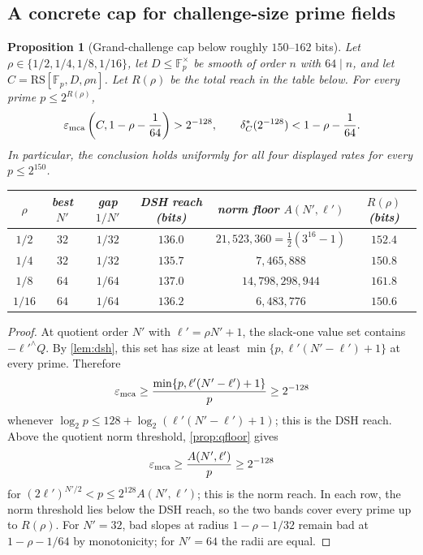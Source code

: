 \documentclass[11pt]{article}
\newtheorem{proposition}[proposition]{Proposition}
\theoremstyle{definition}
\newcommand{\F}{\mathbb F}
\newcommand{\eps}{\varepsilon}
\newcommand{\RS}{\mathrm{RS}}
\newcommand{\emca}{\eps_{\rm mca}}
\newcommand{\Acl}{A}
\begin{document}
\subsection{A concrete cap for challenge-size prime fields}

\begin{proposition}[Grand-challenge cap below roughly $150$--$162$ bits]\label{prop:prize}
Let $\rho\in\{1/2,1/4,1/8,1/16\}$, let $D\le\F_p^\times$ be smooth of order $n$ with $64\mid n$, and let $C=\RS[\F_p,D,\rho n]$.  Let $R(\rho)$ be the total reach in the table below.  For every prime $p\le 2^{R(\rho)}$,
\[
        \emca\left(C,1-\rho-\frac1{64}\right)>2^{-128},
        \qquad
        \delta_C^*(2^{-128})<1-\rho-\frac1{64}.
\]
In particular, the conclusion holds uniformly for all four displayed rates for every $p\le2^{150}$.
\begin{center}\small
\begin{tabular}{cccccc}
\toprule
$\rho$ & best $N'$ & gap $1/N'$ & DSH reach (bits) & norm floor $\Acl(N',\ell')$ & $R(\rho)$ (bits)\\
\midrule
$1/2$  & $32$ & $1/32$ & $136.0$ & $21{,}523{,}360=\tfrac12(3^{16}-1)$ & $152.4$\\
$1/4$  & $32$ & $1/32$ & $135.7$ & $7{,}465{,}888$ & $150.8$\\
$1/8$  & $64$ & $1/64$ & $137.0$ & $14{,}798{,}298{,}944$ & $161.8$\\
$1/16$ & $64$ & $1/64$ & $136.2$ & $6{,}483{,}776$ & $150.6$\\
\bottomrule
\end{tabular}
\end{center}
\end{proposition}

\begin{proof}
At quotient order $N'$ with $\ell'=\rho N'+1$, the slack-one value set contains $-\ell'^{\wedge}Q$.  By \cref{lem:dsh}, this set has size at least $\min\{p,\ell'(N'-\ell')+1\}$ at every prime.  Therefore
\[
        \emca\ge \frac{\min\{p,\ell'(N'-\ell')+1\}}{p}
        \ge 2^{-128}
\]
whenever $\log_2p\le128+
\log_2(\ell'(N'-\ell')+1)$; this is the DSH reach.  Above the quotient norm threshold, \cref{prop:qfloor} gives
\[
        \emca\ge\frac{\Acl(N',\ell')}{p}\ge2^{-128}
\]
for $(2\ell')^{N'/2}<p\le2^{128}\Acl(N',\ell')$; this is the norm reach.  In each row, the norm threshold lies below the DSH reach, so the two bands cover every prime up to $R(\rho)$.  For $N'=32$, bad slopes at radius $1-\rho-1/32$ remain bad at $1-\rho-1/64$ by monotonicity; for $N'=64$ the radii are equal.
\end{proof}
\end{document}
